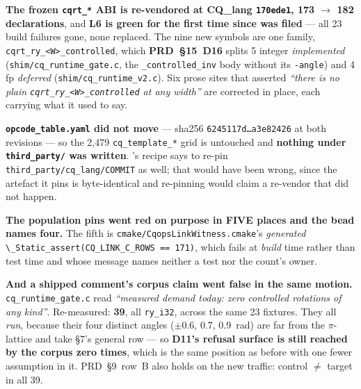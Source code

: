 \textbf{The frozen \texttt{cqrt\_*} ABI is re-vendored at CQ\_lang
\texttt{170ede1}, 173 $\to$ 182 declarations}, and \textbf{L6 is green for the
first time since  was filed} --- all 23 build failures gone, none
replaced. The nine new symbols are one family, \texttt{cqrt\_ry\_<W>\_controlled},
which \textbf{PRD~§15~D16} splits 5 integer \emph{implemented}
(\texttt{shim/cq\_runtime\_gate.c}, the \texttt{\_controlled\_inv} body without
its \texttt{-angle}) and 4 fp \emph{deferred}
(\texttt{shim/cq\_runtime\_v2.c}). Six prose sites that asserted
\emph{``there is no plain \texttt{cqrt\_ry\_<W>\_controlled} at any width''} are
corrected in place, each carrying what it used to say.

\begin{figures}
\end{figures}

\noindent\textbf{\texttt{opcode\_table.yaml} did not move} --- sha256
\texttt{6245117d\dots a3e82426} at both revisions --- so the 2{,}479
\texttt{cq\_template\_*} grid is untouched and \textbf{nothing under
\texttt{third\_party/} was written}. 's recipe says to re-pin
\texttt{third\_party/cq\_lang/COMMIT} as well; that would have been wrong, since
the artefact it pins is byte-identical and re-pinning would claim a re-vendor
that did not happen.

\medskip
\noindent\textbf{The population pins went red on purpose in FIVE places and the
bead names four.} The fifth is
\texttt{cmake/CqopsLinkWitness.cmake}'s \emph{generated}
\texttt{\textbackslash{}\_Static\_assert(CQ\_LINK\_C\_ROWS == 171)}, which fails at
\emph{build} time rather than test time and whose message names neither a test
nor the count's owner.

\medskip
\noindent\textbf{And a shipped comment's corpus claim went false in the same
motion.} \texttt{cq\_runtime\_gate.c} read \emph{``measured demand today: zero
controlled rotations of any kind''}. Re-measured: \textbf{39}, all
\texttt{ry\_i32}, across the same 23 fixtures. They all \emph{run}, because their
four distinct angles ($\pm0.6$, $0.7$, $0.9$~rad) are far from the
$\pi$-lattice and take §7's general row --- so \textbf{D11's refusal surface is
still reached by the corpus zero times}, which is the same position as before
with one fewer assumption in it. PRD~§9~row~B also holds on the new traffic:
control $\neq$ target in all 39.

